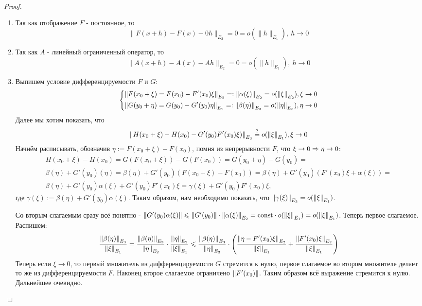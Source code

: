 \begin{proof}~
	\begin{enumerate}
		\item Так как отображение $F$ - постоянное, то
		\[
			\|F(x + h) - F(x) - 0h\|_{E_2} = 0 = o(\|h\|_{E_1}),\ h \to 0
		\]
		
		\item Так как $A$ - линейный ограниченный оператор, то
		\[
			\|A(x + h) - A(x) - Ah\|_{E_2} = 0 = o(\|h\|_{E_1}),\ h \to 0
		\]
		
		\item Выпишем условие дифференцируемости $F$ и $G$:
		\[
		\left\{\begin{aligned}
			\left\|F(x_0 +\xi)=F(x_0)-F'(x_0)\xi\right\|_{E_2}=:\left\|\alpha(\xi)\right\|_{E_2} = o(\left\|\xi\right\|_{E_2}), \xi\to 0 \\
			\left\|G(y_0 +\eta)=G(y_0)-G'(y_0)\eta\right\|_{E_2}=:\left\|\beta(\eta)\right\|_{E_3} = o(\left\|\eta\right\|_{E_3}), \eta\to 0
		\end{aligned}\right.
		\]
		Далее мы хотим показать, что
		\[
		\left\|H(x_0 + \xi)-H(x_0)-G'(y_0)F'(x_0)\xi)\right\|_{E_3} \stackrel{?}{=} o(\left\|\xi\right\|_{E_1}), \xi\to 0
		\]
		Начнём расписывать, обозначив $\eta := F(x_0+\xi)-F(x_0)$, помня из непрерывности $F$, что $\xi\to 0 \Rightarrow \eta\to 0$:
		\begin{multline}
			H(x_0 + \xi) - H(x_0) = G(F(x_0+\xi))-G(F(x_0)) = G(y_0 + \eta) - G(y_0) = \\
			\beta(\eta) + G'(y_0)(\eta) = \beta(\eta) + G'(y_0)(F(x_0+\xi)-F(x_0)) = \beta(\eta) + G'(y_0)(F'(x_0)\xi + \alpha(\xi)) = \\
			  \beta(\eta) + G'(y_0)\alpha(\xi) + G'(y_0)F'(x_0)\xi = \gamma(\xi) + G'(y_0)F'(x_0)\xi,
		\end{multline}
		где $\gamma(\xi):= \beta(\eta) + G'(y_0)\alpha(\xi)$. Таким образом, нам необходимо показать, что $\left\|\gamma(\xi)\right\|_{E_3} = o(\left\|\xi\right\|_{E_1})$. 
		
		Со вторым слагаемым сразу всё понятно - $\left\|G'(y_0)\alpha(\xi)\right\| \leqslant \left\|G'(y_0)\right\|\cdot \left\|\alpha(\xi)\right\|_{E_2} = \mathrm{const} \cdot o(\left\|\xi\right\|_{E_1}) = o(\left\|\xi\right\|_{E_1})$. 
		Теперь первое слагаемое. Распишем:
		\[
		\frac{\left\|\beta(\eta)\right\|_{E_3}}{\left\|\xi\right\|_{E_1}} =\frac{\left\|\beta(\eta)\right\|_{E_3}}{\left\|\eta\right\|_{E_2}} \cdot \frac{\left\|\eta\right\|_{E_2}}{\left\|\xi\right\|_{E_1}}\leqslant \frac{\left\|\beta(\eta)\right\|_{E_3}}{\left\|\eta\right\|_{E_2}} \cdot \left( \frac{\left\|\eta - F'(x_0)\xi\right\|_{E_2}}{\left\|\xi\right\|_{E_1}} + \frac{\left\|F'(x_0)\xi\right\|_{E_2}}{\left\|\xi\right\|_{E_1}} \right)
		\]
		Теперь если $\xi\to 0$, то первый множитель из дифференцируемости $G$ стремится к нулю, первое слагаемое во втором множителе делает то же из дифференцируемости $F$. Наконец второе слагаемое ограничено $\left\|F'(x_0)\right\|$. Таким образом всё выражение стремится к нулю. Дальнейшее очевидно.
	\end{enumerate}
\end{proof}

